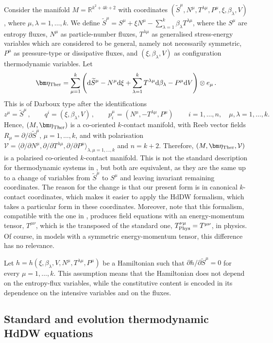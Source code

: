 \documentclass[11pt,twoside]{article}
\theoremstyle{plain}
\theoremstyle{definition}
\theoremstyle{remark}
\renewcommand{\d}{\mathrm{d}}
\begin{document}
Consider the manifold $M=\mathbb{R}^{k^2+4k+2}$ with coordinates $(\widetilde{S}^\mu,N^\mu,T^{\lambda\mu},P^\mu,\xi,\beta_\lambda,V)$, where $\mu,\lambda=1,\dots,k$. We define $\widetilde{S}^\mu=S^\mu+\xi N^\mu-\sum_{\lambda=1}^k\beta_\lambda  T^{\lambda\mu}$, where the $S^\mu$ are entropy fluxes, $N^\mu$ as particle-number fluxes, $T^{\lambda\mu}$ as generalised stress-energy variables which are considered to be general, namely not necessarily symmetric, $P^\mu$ as pressure-type or dissipative fluxes, and $(\xi,\beta_\lambda,V)$ as configuration thermodynamic variables. Let 
\[\bm \eta_{\rm Ther}=\sum_{\mu=1}^k \left(\d \widetilde{S}^\mu-N^\mu \d\xi+\sum_{\lambda=1}^k T^{\lambda\mu}\d\beta_\lambda-P^\mu \d V\right)\otimes e_\mu\,.\] 
This is of Darboux type after the identifications 
\[z^\mu=\widetilde{S}^\mu\,, \qquad q^i=(\xi,\beta_\lambda,V)\,,\qquad p_i^\mu=(N^\mu,-T^{\lambda\mu},P^\mu)\,\qquad i=1,\ldots,n,\quad \mu,\lambda=1,\ldots,k.
\]
Hence, $(M,{\bm \eta}_{\rm Ther})$ is a co-oriented $k$-contact manifold, with Reeb vector fields $R_\mu=\partial/\partial \widetilde{S}^\mu$, $\mu=1,\dots,k$, and with polarisation $\mathcal{V}=\langle \partial/\partial N^\mu,\partial/\partial T^{\lambda\mu},\partial/\partial P^\mu\rangle_{\lambda,\mu=1,\ldots,k}$ and $n=k+2$. Therefore, $(M,\bm \eta_{\rm Ther},\mathcal{V})$ is a polarised co-oriented $k$-contact manifold. This is not the standard description for thermodynamic systems in \cite{HLM_26}, but both are equivalent, as they are the same up to a change of variables from $\widetilde{S}^\mu$ to $S^\mu$ and leaving invariant remaining  coordinates. The reason for the change is that our present form is in canonical $k$-contact coordinates, which makes it easier to apply the HdDW formalism, which takes a particular form in these coordinates. Moreover, note that this formalism, compatible with the one in \cite{HLM_26}, produces field equations with an energy-momentum tensor, $T^{\mu\nu}$, which is the transposed of the standard one, $T_{\rm Phys}^{\nu\mu}=T^{\mu\nu}$, in physics. Of course, in models with a symmetric energy-momentum tensor, this difference has no relevance.  

Let $h=h(\xi,\beta_\lambda,V,N^\mu,T^{\lambda\mu},P^\mu)$ be a Hamiltonian such that $\partial h/\partial \widetilde{S}^\mu=0$ for every $\mu=1,\dots,k$. This assumption means that the Hamiltonian does not depend on the entropy-flux variables, while the constitutive content is encoded in its dependence on the intensive variables and on the fluxes.

\subsection{Standard and evolution thermodynamic HdDW equations}
\end{document}
